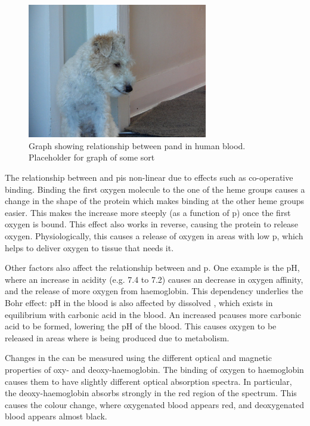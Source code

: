 \begin{figure}[ht]
\centering
\includegraphics[width=0.7\textwidth]{figures/background/placeholder.JPG}
\caption{Graph showing relationship between p\Otwo and \SOtwo in human blood. Placeholder for graph of some sort}
\label{fig:back-po2so2}
\end{figure}

The relationship between \SOtwo and p\Otwo is non-linear due to effects such as co-operative binding.
Binding the first oxygen molecule to the one of the heme groups causes a change in the shape of the protein which makes binding at the other heme groups easier.
This makes the \SOtwo increase more steeply (as a function of p\Otwo) once the first oxygen is bound.
This effect also works in reverse, causing the protein to release oxygen.
Physiologically, this causes a release of oxygen in areas with low p\Otwo, which helps to deliver oxygen to tissue that needs it.

Other factors also affect the relationship between \SOtwo and p\Otwo. \cite{HallGuytonHallTextbook2015}
One example is the pH, where an increase in acidity (e.g. 7.4 to 7.2) causes an decrease in oxygen affinity, and the release of more oxygen from haemoglobin.
This dependency underlies the Bohr effect:
pH in the blood is also affected by dissolved \COtwo, which exists in equilibrium with carbonic acid in the blood.
An increased p\COtwo causes more carbonic acid to be formed, lowering the pH of the blood.
This causes oxygen to be released in areas where \COtwo is being produced due to metabolism.

Changes in the \SOtwo can be measured using the different optical and magnetic properties of oxy- and deoxy-haemoglobin.
The binding of oxygen to haemoglobin causes them to have slightly different optical absorption spectra.
In particular, the deoxy-haemoglobin absorbs strongly in the red region of the spectrum.
This causes the colour change, where oxygenated blood appears red, and deoxygenated blood appears almost black.


